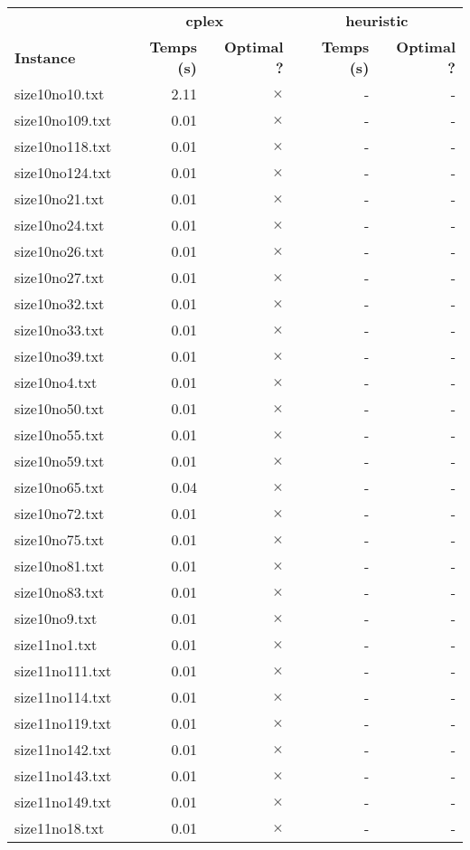 \documentclass{article}
\begin{document}
\begin{center}
\renewcommand{\arraystretch}{1.4} 
 \begin{tabular}{lrrrr}
	\hline
 & \multicolumn{2}{c}{\textbf{cplex}} & \multicolumn{2}{c}{\textbf{heuristic}}\\
\textbf{Instance}  & \textbf{Temps (s)} & \textbf{Optimal ?}  & \textbf{Temps (s)} & \textbf{Optimal ?} \\\hline

size10no10.txt & 2.11 & 
$\times$
 & - & - 
\\
size10no109.txt & 0.01 & 
$\times$
 & - & - 
\\
size10no118.txt & 0.01 & 
$\times$
 & - & - 
\\
size10no124.txt & 0.01 & 
$\times$
 & - & - 
\\
size10no21.txt & 0.01 & 
$\times$
 & - & - 
\\
size10no24.txt & 0.01 & 
$\times$
 & - & - 
\\
size10no26.txt & 0.01 & 
$\times$
 & - & - 
\\
size10no27.txt & 0.01 & 
$\times$
 & - & - 
\\
size10no32.txt & 0.01 & 
$\times$
 & - & - 
\\
size10no33.txt & 0.01 & 
$\times$
 & - & - 
\\
size10no39.txt & 0.01 & 
$\times$
 & - & - 
\\
size10no4.txt & 0.01 & 
$\times$
 & - & - 
\\
size10no50.txt & 0.01 & 
$\times$
 & - & - 
\\
size10no55.txt & 0.01 & 
$\times$
 & - & - 
\\
size10no59.txt & 0.01 & 
$\times$
 & - & - 
\\
size10no65.txt & 0.04 & 
$\times$
 & - & - 
\\
size10no72.txt & 0.01 & 
$\times$
 & - & - 
\\
size10no75.txt & 0.01 & 
$\times$
 & - & - 
\\
size10no81.txt & 0.01 & 
$\times$
 & - & - 
\\
size10no83.txt & 0.01 & 
$\times$
 & - & - 
\\
size10no9.txt & 0.01 & 
$\times$
 & - & - 
\\
size11no1.txt & 0.01 & 
$\times$
 & - & - 
\\
size11no111.txt & 0.01 & 
$\times$
 & - & - 
\\
size11no114.txt & 0.01 & 
$\times$
 & - & - 
\\
size11no119.txt & 0.01 & 
$\times$
 & - & - 
\\
size11no142.txt & 0.01 & 
$\times$
 & - & - 
\\
size11no143.txt & 0.01 & 
$\times$
 & - & - 
\\
size11no149.txt & 0.01 & 
$\times$
 & - & - 
\\
size11no18.txt & 0.01 & 
$\times$
 & - & - 
\\
\hline\end{tabular}
\end{center}
\end{document}
